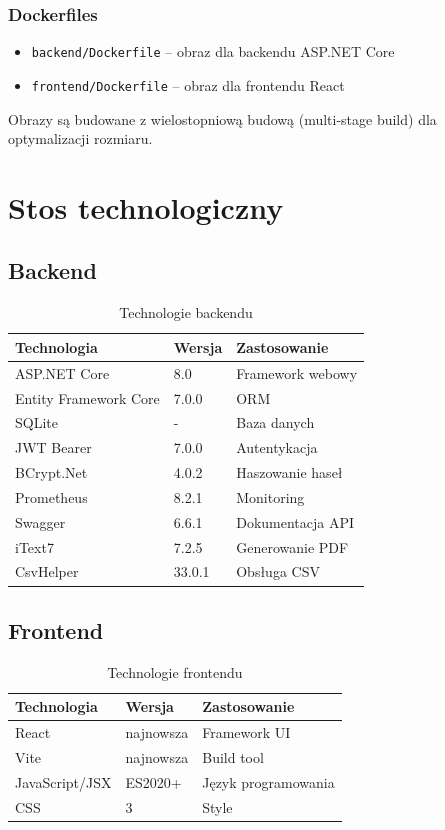 \documentclass[times]{san}
\begin{document}
\subsubsection{Dockerfiles}

\begin{itemize}
    \item \texttt{backend/Dockerfile} -- obraz dla backendu ASP.NET Core
    \item \texttt{frontend/Dockerfile} -- obraz dla frontendu React
\end{itemize}

Obrazy są budowane z wielostopniową budową (multi-stage build) dla optymalizacji rozmiaru.

\section{Stos technologiczny}

\subsection{Backend}

\begin{table}[h]
\centering
\caption{Technologie backendu}
\label{tab:backend_tech}
\begin{tabular}{|l|l|p{4cm}|}
\hline
Technologia & Wersja & Zastosowanie \\
\hline
ASP.NET Core & 8.0 & Framework webowy \\
Entity Framework Core & 7.0.0 & ORM \\
SQLite & - & Baza danych \\
JWT Bearer & 7.0.0 & Autentykacja \\
BCrypt.Net & 4.0.2 & Haszowanie haseł \\
Prometheus & 8.2.1 & Monitoring \\
Swagger & 6.6.1 & Dokumentacja API \\
iText7 & 7.2.5 & Generowanie PDF \\
CsvHelper & 33.0.1 & Obsługa CSV \\
\hline
\end{tabular}
\end{table}

\subsection{Frontend}

\begin{table}[h]
\centering
\caption{Technologie frontendu}
\label{tab:frontend_tech}
\begin{tabular}{|l|l|p{4cm}|}
\hline
Technologia & Wersja & Zastosowanie \\
\hline
React & najnowsza & Framework UI \\
Vite & najnowsza & Build tool \\
JavaScript/JSX & ES2020+ & Język programowania \\
CSS & 3 & Style \\
\hline
\end{tabular}
\end{table}
\end{document}
